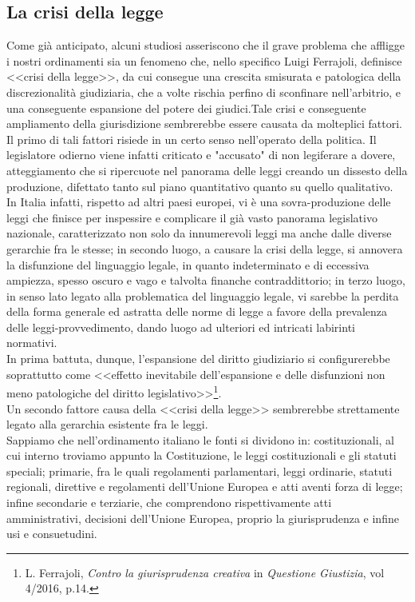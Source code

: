 \subsection{La crisi della legge}
Come già anticipato, alcuni studiosi asseriscono che il grave problema che affligge i nostri ordinamenti sia un fenomeno che, nello specifico Luigi Ferrajoli, definisce <<crisi della legge>>, da cui consegue una crescita smisurata e patologica della discrezionalità giudiziaria, che a volte rischia perfino di sconfinare nell’arbitrio, e una conseguente espansione del potere dei giudici.Tale crisi e conseguente ampliamento della giurisdizione sembrerebbe essere causata da molteplici fattori.
\\Il primo di tali fattori risiede in un certo senso nell'operato della politica. Il legislatore odierno viene infatti criticato e "accusato" di non legiferare a dovere, atteggiamento che si ripercuote nel panorama delle leggi creando un dissesto della produzione, difettato tanto sul piano quantitativo quanto su quello qualitativo. \\In Italia infatti, rispetto ad altri paesi europei, vi è una sovra-produzione delle leggi che finisce per inspessire e complicare il già vasto panorama legislativo nazionale, caratterizzato non solo da innumerevoli leggi ma anche dalle diverse gerarchie fra le stesse; in secondo luogo, a causare la crisi della legge, si annovera la disfunzione del linguaggio legale, in quanto indeterminato e di eccessiva ampiezza, spesso oscuro e vago e talvolta finanche contraddittorio; in terzo luogo, in senso lato legato alla problematica del linguaggio legale, vi sarebbe la perdita della forma generale ed astratta delle norme di legge a favore della prevalenza delle leggi-provvedimento, dando luogo ad ulteriori ed intricati labirinti normativi.
\\In prima battuta, dunque, l’espansione del diritto giudiziario si configurerebbe soprattutto come <<effetto inevitabile dell’espansione e delle disfunzioni non meno patologiche del diritto legislativo>>\footnote{L. Ferrajoli, \textit{Contro la giurisprudenza creativa} in \textit{Questione Giustizia}, vol 4/2016, p.14.}.
\\Un secondo fattore causa della <<crisi della legge>> sembrerebbe strettamente legato alla gerarchia esistente fra le leggi.
\\Sappiamo che nell'ordinamento italiano le fonti si dividono in: costituzionali, al cui interno troviamo appunto la Costituzione, le leggi costituzionali e gli statuti speciali; primarie, fra le quali regolamenti parlamentari, leggi ordinarie, statuti regionali, direttive e regolamenti dell'Unione Europea e atti aventi forza di legge; infine secondarie e terziarie, che comprendono rispettivamente atti amministrativi, decisioni dell'Unione Europea, proprio la giurisprudenza e infine usi e consuetudini.
